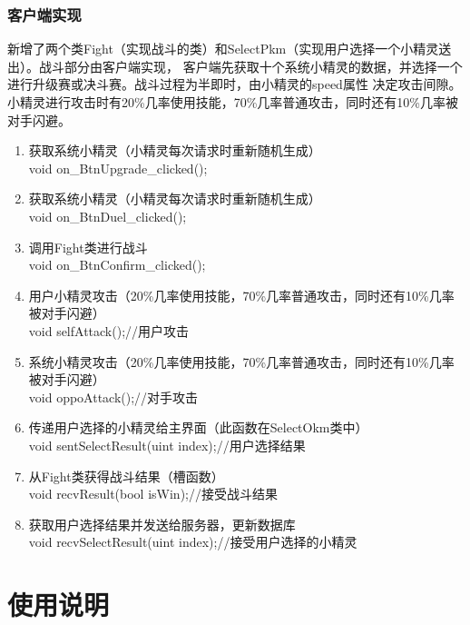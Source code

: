 \documentclass{ctexart}
\begin{document}
\subsubsection{客户端实现}
新增了两个类Fight（实现战斗的类）和SelectPkm（实现用户选择一个小精灵送出）。战斗部分由客户端实现，
客户端先获取十个系统小精灵的数据，并选择一个进行升级赛或决斗赛。战斗过程为半即时，由小精灵的speed属性
决定攻击间隙。小精灵进行攻击时有20\%几率使用技能，70\%几率普通攻击，同时还有10\%几率被对手闪避。
\begin{enumerate}
  \item 获取系统小精灵（小精灵每次请求时重新随机生成）\\
    void on\_BtnUpgrade\_clicked();
  \item 获取系统小精灵（小精灵每次请求时重新随机生成）\\
    void on\_BtnDuel\_clicked();
  \item 调用Fight类进行战斗\\
    void on\_BtnConfirm\_clicked();
  \item 用户小精灵攻击（20\%几率使用技能，70\%几率普通攻击，同时还有10\%几率被对手闪避）\\
    void selfAttack();//用户攻击
  \item 系统小精灵攻击（20\%几率使用技能，70\%几率普通攻击，同时还有10\%几率被对手闪避）\\
    void oppoAttack();//对手攻击
  \item 传递用户选择的小精灵给主界面（此函数在SelectOkm类中）\\
    void sentSelectResult(uint index);//用户选择结果
  \item 从Fight类获得战斗结果（槽函数）\\
    void recvResult(bool isWin);//接受战斗结果
  \item 获取用户选择结果并发送给服务器，更新数据库\\
    void recvSelectResult(uint index);//接受用户选择的小精灵
\end{enumerate}

\section{使用说明}
\end{document}

